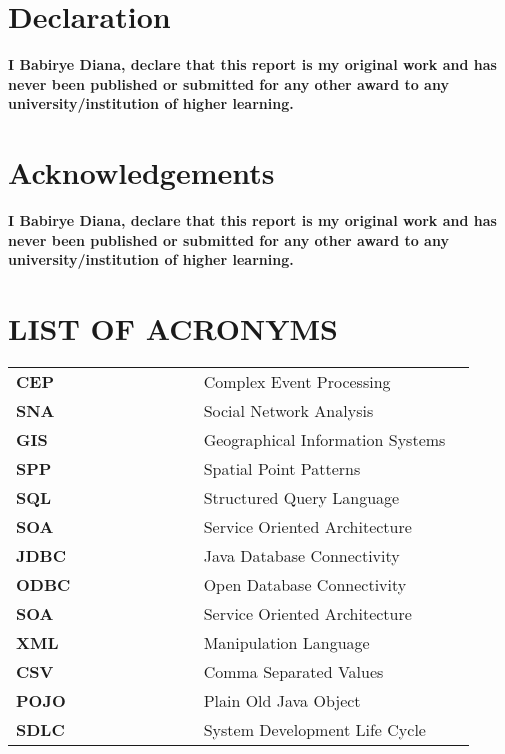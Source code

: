 

\section*{Declaration}

\pagestyle{plain}

\begin{center}


{\bf I Babirye Diana, declare that this report is my original work and has never been published or submitted for any other award to any university/institution of higher learning.}\\ 

\section*{Acknowledgements}

\pagestyle{plain}


{\bf I Babirye Diana, declare that this report is my original work and has never been published or submitted for any other award to any university/institution of higher learning.}\\ 


\end{center}
%
\section*{LIST OF ACRONYMS}

\pagestyle{plain}

\begin{tabular}{lll}

{\bf CEP }&~~~~~~~~~~~~~~ 	        Complex Event Processing\\
{\bf SNA}&~~~~~~~~~~~~~~                Social Network Analysis\\
{\bf GIS}&~~~~~~~~~~~~~~ 		Geographical Information Systems \\
{\bf SPP}&~~~~~~~~~~~~~~                Spatial Point Patterns\\
{\bf SQL}&~~~~~~~~~~~~~~                Structured Query Language\\
{\bf SOA}&~~~~~~~~~~~~~~                Service Oriented Architecture\\
{\bf JDBC}&~~~~~~~~~~~~~~               Java Database Connectivity\\
{\bf ODBC}&~~~~~~~~~~~~~~               Open Database Connectivity\\
{\bf SOA}&~~~~~~~~~~~~~~                Service Oriented Architecture\\
{\bf XML}&~~~~~~~~~~~~~~ 		Manipulation Language\\
{\bf CSV}&~~~~~~~~~~~~~~ 		Comma Separated Values\\
{\bf POJO}&~~~~~~~~~~~~~~ 		Plain Old Java Object\\
{\bf SDLC}&~~~~~~~~~~~~~~ 	        System Development Life Cycle\\



\end{tabular}
